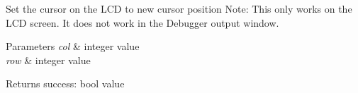 Set the cursor on the L\+CD to new cursor position Note\+: This only works on the L\+CD screen. It does not work in the Debugger output window. 
\begin{DoxyParams}{Parameters}
{\em col} & integer value \\
\hline
{\em row} & integer value \\
\hline
\end{DoxyParams}
\begin{DoxyReturn}{Returns}
success\+: bool value 
\end{DoxyReturn}
